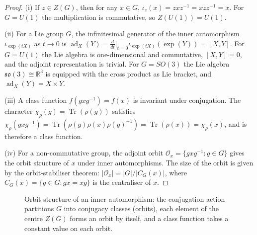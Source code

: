 \begin{proof}
(i) If $z \in Z(G)$, then for any $x \in G$, $\iota_z(x) = zxz^{-1} = xzz^{-1} = x$. For $G = U(1)$ the multiplication is commutative, so $Z(U(1)) = U(1)$.

(ii) For a Lie group $G$, the infinitesimal generator of the inner automorphism $\iota_{\exp(tX)}$ as $t \to 0$ is $\operatorname{ad}_X(Y) = \frac{d}{dt}\big|_{t=0} \iota_{\exp(tX)}(\exp(Y)) = [X,Y]$. For $G = U(1)$ the Lie algebra is one-dimensional and commutative, $[X,Y]=0$, and the adjoint representation is trivial. For $G = SO(3)$ the Lie algebra $\mathfrak{so}(3) \cong \mathbb{R}^3$ is equipped with the cross product as Lie bracket, and $\operatorname{ad}_X(Y) = X \times Y$.

(iii) A class function $f(gxg^{-1}) = f(x)$ is invariant under conjugation. The character $\chi_\rho(g) = \operatorname{Tr}(\rho(g))$ satisfies $\chi_\rho(gxg^{-1}) = \operatorname{Tr}(\rho(g)\rho(x)\rho(g)^{-1}) = \operatorname{Tr}(\rho(x)) = \chi_\rho(x)$, and is therefore a class function.

(iv) For a non-commutative group, the adjoint orbit $\mathcal{O}_x = \{gxg^{-1} : g \in G\}$ gives the orbit structure of $x$ under inner automorphisms. The size of the orbit is given by the orbit-stabiliser theorem: $|\mathcal{O}_x| = |G|/|C_G(x)|$, where $C_G(x) = \{g \in G : gx = xg\}$ is the centraliser of $x$.
\end{proof}

\begin{figure}[htbp]
\centering
{}
\caption{Orbit structure of an inner automorphism: the conjugation action partitions $G$ into conjugacy classes (orbits), each element of the centre $Z(G)$ forms an orbit by itself, and a class function takes a constant value on each orbit.}
\label{fig:inner_automorphism_orbits}
\end{figure}

